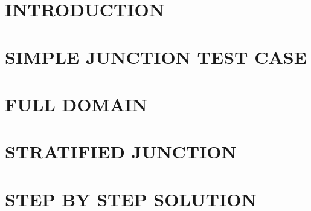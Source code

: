 \documentclass[a4paper,10pt,twoside]{report}
\begin{document}
\pdfgraphics
\def\contentsname{\textbf{\normalsize TABLE OF CONTENTS}\pdfbookmark[1]{Table of
contents}{contents}}
\def\indexname{Index of the main variables and keywords}

\large
\makepdgCS
\normalsize

\begin{center}\begin{singlespace}
\tableofcontents
\end{singlespace}\end{center}

%

%
%
\passepage
{}
\part{INTRODUCTION}

\setcounter{section}{0}
\part{SIMPLE JUNCTION TEST CASE}

\setcounter{section}{0}
\part{FULL DOMAIN}



\setcounter{section}{0}
\part{STRATIFIED JUNCTION}

\setcounter{section}{0}
\part{STEP BY STEP SOLUTION}





%
%

%
\end{document}
